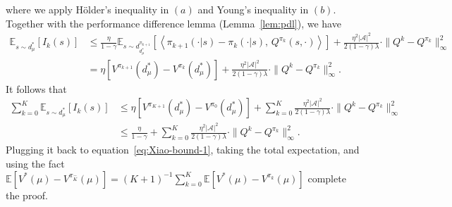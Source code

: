 \documentclass[10pt]{article}
\newcommand{\calA}{\mathcal{A}}
\newcommand{\E}{\mathbb{E}}
\newcommand{\ls}{\left}
\newcommand{\rs}{\right}
\theoremstyle{plain}
\theoremstyle{definition}
\begin{document}
    where we apply H{\"o}lder's inequality in $(a)$ and Young's inequality in $(b)$. Together with the performance difference lemma (Lemma~\ref{lem:pdl}), we have
    \begin{align*}
        \E_{s\sim d^*_\mu}[I_k(s)] &\leq \frac{\eta}{1-\gamma} \E_{s\sim d^{\pi_{k+1}}_{d^*_\mu}}\ls[ \ls\langle \pi_{k+1}(\cdot|s) - \pi_k(\cdot|s), \, Q^{\pi_k}(s,\cdot) \rs\rangle \rs] + \frac{\eta^2|\calA|^2}{2(1-\gamma)\lambda} \cdot \| Q^{k} - Q^{\pi_k} \|_\infty^2 \\
        &= \eta \ls[ V^{\pi_{k+1}}(d^*_\mu) - V^{\pi_k}(d^*_\mu) \rs] + \frac{\eta^2|\calA|^2}{2(1-\gamma)\lambda} \cdot \| Q^{k} - Q^{\pi_k} \|_\infty^2.
        \end{align*}
        It follows that
        \begin{align*}
        \sum_{k=0}^K \E_{s\sim d^*_\mu}[I_k(s)] & \leq \eta \ls[ V^{\pi_{K+1}} (d^*_\mu) - V^{\pi_0}(d^*_\mu) \rs] + \sum_{k=0}^{K}\frac{\eta^2|\calA|^2}{2(1-\gamma)\lambda} \cdot \| Q^{k} - Q^{\pi_k} \|_\infty^2 \\
        &\leq \frac{\eta}{1-\gamma} + \sum_{k=0}^{K}\frac{\eta^2|\calA|^2}{2(1-\gamma)\lambda} \cdot \| Q^{k} - Q^{\pi_k} \|_\infty^2.
    \end{align*}
    Plugging it back to equation~\eqref{eq:Xiao-bound-1}, taking the total expectation, and using the fact $\E\ls[ V^*(\mu) - V^{\pi_{\hat K}}(\mu) \rs] = (K+1)^{-1} \sum_{k=0}^K \E\ls[ V^* (\mu) - V^{\pi_k}(\mu) \rs]$ complete the proof.

\end{document}
